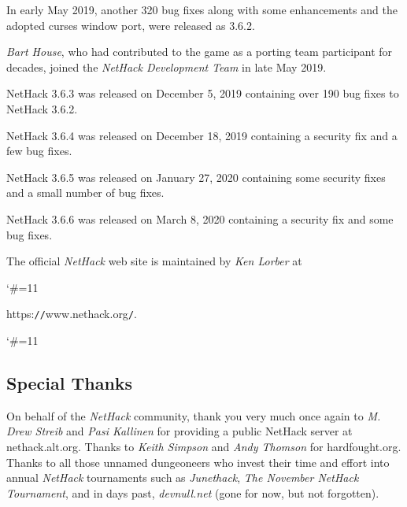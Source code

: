 \medskip
In early May 2019, another 320 bug fixes along with some enhancements and
the adopted curses window port, were released as 3.6.2.

\medskip
{\it Bart House}, who had contributed to the game as a porting team participant
for decades, joined the {\it NetHack Development Team} in late May 2019.

\medskip
NetHack 3.6.3 was released on December 5, 2019 containing over 190 bug
fixes to NetHack 3.6.2.

\medskip
NetHack 3.6.4 was released on December 18, 2019 containing a security fix and
a few bug fixes.

\medskip
NetHack 3.6.5 was released on January 27, 2020 containing some security fixes
and a small number of bug fixes.

\medskip
NetHack 3.6.6 was released on March 8, 2020 containing a security fix and
some bug fixes.

\medskip
\nd The official {\it NetHack\/} web site is maintained by {\it Ken Lorber} at
{\catcode`\#=11
}
https:{\tt /}{\tt /}www.nethack.org{\tt /}.
{\catcode`\#=11
}


\subsection*{Special Thanks}
\nd On behalf of the {\it NetHack\/} community, thank you very much once
again to {\it M. Drew Streib} and {\it Pasi Kallinen} for providing a
public NetHack server at nethack.alt.org. Thanks to {\it Keith Simpson}
and {\it Andy Thomson} for hardfought.org. Thanks to all those
unnamed dungeoneers who invest their time and effort into annual
{\it NetHack\/} tournaments such as {\it Junethack},
{\it The November NetHack Tournament}, and in days past,
{\it devnull.net\/} (gone for now, but not forgotten).
\clearpage

